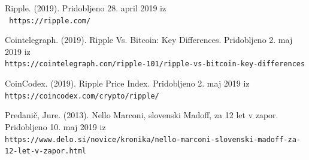 \documentclass[letterpaper, titlepage, freqn]{article}
\begin{document}
\begin{thebibliography}{9}
\bibitem{} 
Ripple. (2019). Pridobljeno 28. april 2019 iz
\\\texttt{ https://ripple.com/}

\bibitem{} 
Cointelegraph. (2019). Ripple Vs. Bitcoin: Key Differences. Pridobljeno 2. maj 2019 iz
\\\texttt{https://cointelegraph.com/ripple-101/ripple-vs-bitcoin-key-differences}

\bibitem{} 
CoinCodex. (2019). Ripple Price Index. Pridobljeno 2. maj 2019 iz
\\\texttt{https://coincodex.com/crypto/ripple/}

\bibitem{} 
Predanič, Jure. (2013). Nello Marconi, slovenski Madoff, za 12 let v zapor. Pridobljeno 10. maj 2019 iz
\\\texttt{https://www.delo.si/novice/kronika/nello-marconi-slovenski-madoff-za-12-let-v-zapor.html}


\end{thebibliography}
\end{document}

